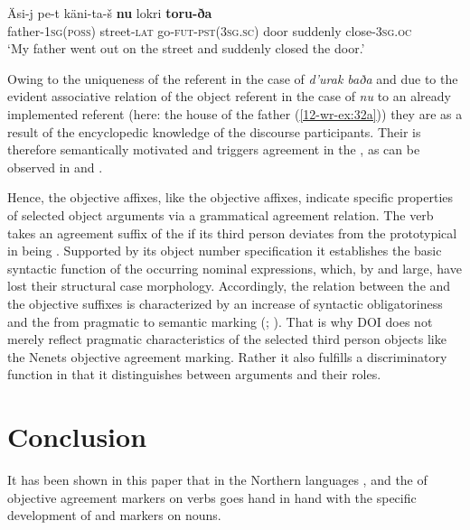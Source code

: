 \documentclass[output=paper]{LSP/langsci}
\begin{document}
\ex\label{12-wr-ex:32b}
\gll Äsi-j pe-t käni-ta-š \textbf{nu} lokri \textbf{toru-ða}\\
 father-\textsc{1sg(poss)} street-\textsc{lat} go\textsc{-fut-pst(3sg.sc)} door suddenly close\textsc{-3sg.oc}\\

\glt ‘My father went out on the street and suddenly closed the door.’
\z
\z

Owing to the uniqueness of the referent in the case of \textit{d’urak baða} and due to the evident associative relation of the object referent in the case of \textit{nu} to an already implemented referent (here: the house of the father (\cf \ref{12-wr-ex:32a})) they are  as a result of the encyclopedic knowledge of the discourse participants. Their  is therefore semantically motivated and triggers agreement in the , as can be observed in  and . 

Hence, the  objective affixes, like the  objective affixes, indicate specific properties of selected object arguments via a grammatical agreement relation. 
The  verb takes an agreement suffix of the  if its third person  deviates from the prototypical  in being . 
Supported by its object number specification it establishes the basic syntactic function of the occurring nominal expressions, which, by and large, have lost their structural case morphology. Accordingly, the relation between the  and the  objective suffixes is characterized by an increase of syntactic obligatoriness and the  from pragmatic  to semantic  marking (\cf \citealt[57]{Lehmann1982Thoughts}; \citealt[39]{Himmelmann1997Deiktikon}). 
That is why  DOI does not merely reflect pragmatic characteristics of the selected third person objects like the Nenets objective agreement marking. Rather it also fulfills a discriminatory function in that it distinguishes between arguments and their roles. 

\section{Conclusion}\label{12-wr-sec:6}

It has been shown in this paper that in the Northern  languages ,  and  the  of objective agreement markers on verbs goes hand in hand with the specific development of  and  markers on nouns. 
\end{document}
